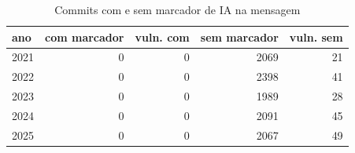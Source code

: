\begin{table}[htbp]
\centering
\caption{Commits com e sem marcador de IA na mensagem}
\label{tab:ai_markers}
\begin{tabular}{lrrrr}
\toprule
ano & com marcador & vuln. com & sem marcador & vuln. sem \\
\midrule
2021 & 0 & 0 & 2069 & 21 \\
2022 & 0 & 0 & 2398 & 41 \\
2023 & 0 & 0 & 1989 & 28 \\
2024 & 0 & 0 & 2091 & 45 \\
2025 & 0 & 0 & 2067 & 49 \\
\bottomrule
\end{tabular}
\end{table}
